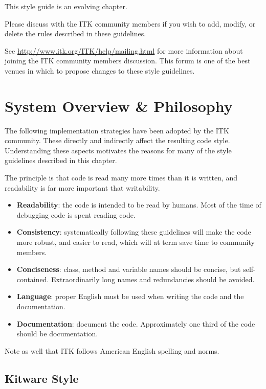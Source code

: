 This style guide is an evolving chapter.

Please discuss with the ITK community members if you wish to add, modify, or
delete the rules described in these guidelines.

See \href{http://www.itk.org/ITK/help/mailing.html}{http://www.itk.org/ITK/help/mailing.html}
for more information about joining the ITK community members discussion. This
forum is one of the best venues in which to propose changes to these style
guidelines.


\section{System Overview \& Philosophy}
\label{sec:SystemOverviewPhilosophy}

The following implementation strategies have been adopted by the ITK community.
These directly and indirectly affect the resulting code style. Understanding
these aspects motivates the reasons for many of the style guidelines described
in this chapter.

The principle is that code is read many more times than it is written, and
readability is far more important that writability.

\begin{itemize}
\item \textbf{Readability}: the code is intended to be read by humans. Most of
the time of debugging code is spent reading code.
\item \textbf{Consistency}: systematically following these guidelines will make
the code more robust, and easier to read, which will at term save time to
community members.
\item \textbf{Conciseness}: class, method and variable names should be concise,
but self-contained. Extraordinarily long names and redundancies should be
avoided.
\item \textbf{Language}: proper English must be used when writing the code and
the documentation.
\item \textbf{Documentation}: document the code. Approximately one third of the
code should be documentation.
\end{itemize}

Note as well that ITK follows American English spelling and norms.


\subsection{Kitware Style}
\label{subsec:KWStyle}

